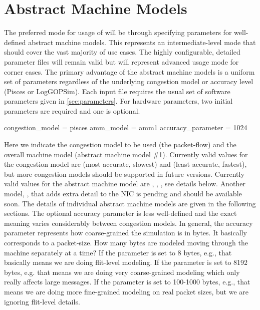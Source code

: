 
\section{Abstract Machine Models}
\label{sec:amm}

The preferred mode for usage of \sstmacro will be through specifying parameters for well-defined abstract machine models.
This represents an intermediate-level mode that should cover the vast majority of use cases.
The highly configurable, detailed parameter files will remain valid but will represent advanced usage mode for corner cases.
The primary advantage of the abstract machine models is a uniform set of parameters regardless of the underlying congestion model or accuracy level (Pisces or LogGOPSim).
Each input file requires the usual set of software parameters given in \ref{sec:parameters}.
For hardware parameters, two initial parameters are required and one is optional.

\begin{ViFile}
congestion_model = pisces
amm_model = amm1
accuracy_parameter = 1024
\end{ViFile} 

Here we indicate the congestion model to be used (the packet-flow) and the overall machine model (abstract machine model \#1).
Currently valid values for the congestion model are  (most accurate, slowest) and  (least accurate, fastest),
but more congestion models should be supported in future versions.
Currently valid values for the abstract machine model are , , , see details below. 
Another model, , that adds extra detail to the NIC is pending and should be available soon.
The details of individual abstract machine models are given in the following sections.
The optional accuracy parameter is less well-defined and the exact meaning varies considerably between congestion models.
In general, the accuracy parameter represents how coarse-grained the simulation is in bytes.
It basically corresponds to a packet-size. How many bytes are modeled moving through the machine separately at a time?
If the parameter is set to 8 bytes, e.g., that basically means we are doing flit-level modeling.
If the parameter is set to 8192 bytes, e.g. that means we are doing very coarse-grained modeling which only really affects large messages.
If the parameter is set to 100-1000 bytes, e.g., that means we are doing more fine-grained modeling on real packet sizes, but we are ignoring flit-level details.

